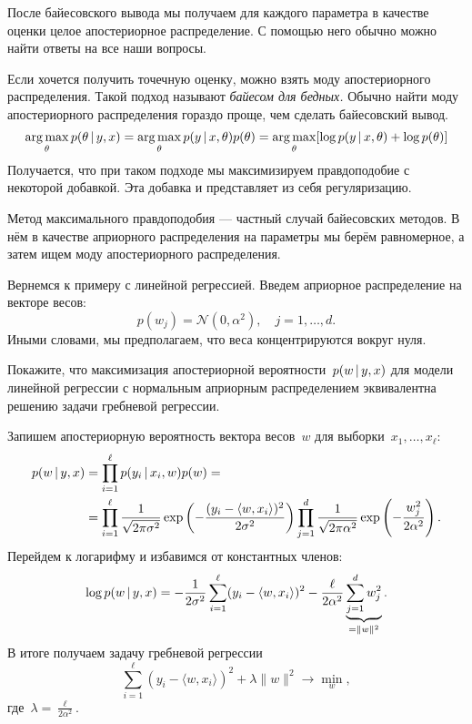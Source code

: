 \documentclass[12pt,fleqn]{article}
\begin{document}
После байесовского вывода мы получаем для каждого параметра в качестве оценки целое апостериорное распределение. С помощью него обычно можно найти ответы на все наши вопросы. 

Если хочется получить точечную оценку, можно взять моду апостериорного распределения. Такой подход называют \emph{байесом для бедных.} Обычно найти моду апостериорного распределения гораздо проще, чем сделать байесовский вывод. 
\[
\mathop{\rm arg\,max}\limits_{\theta} p(\theta \mspace{3mu}{|}\mspace{3mu} y, x) = \mathop{\rm arg\,max}\limits_{\theta} p(y \mspace{3mu}{|}\mspace{3mu} x, \theta) p(\theta) = \mathop{\rm arg\,max}\limits_{\theta}[\log p(y \mspace{3mu}{|}\mspace{3mu} x, \theta) + \log p(\theta)]
\]
Получается, что при таком подходе мы максимизируем правдоподобие с некоторой добавкой. Эта добавка и представляет из себя регуляризацию. 

Метод максимального правдоподобия --- частный случай байесовских методов. В нём в качестве априорного распределения на параметры мы берём равномерное, а затем ищем моду апостериорного распределения. 

Вернемся к примеру с линейной регрессией.
Введем априорное распределение на векторе весов:
\[
    p(w_j)
    =
    \mathcal{N}(0, \alpha^2),
    \quad j = 1, \dots, d.
\]
Иными словами, мы предполагаем, что веса концентрируются вокруг нуля.

\begin{vkProblem}
    Покажите, что максимизация апостериорной вероятности~$p(w \mspace{3mu}{|}\mspace{3mu} y, x)$
    для модели линейной регрессии с нормальным априорным распределением
    эквивалентна решению задачи гребневой регрессии.
\end{vkProblem}

\begin{esSolution}
    Запишем апостериорную вероятность вектора весов~$w$ для выборки~$x_1, \dots, x_\ell$:
    \begin{align*}
        p(w \mspace{3mu}{|}\mspace{3mu} y, x)
        &=
        \prod_{i = 1}^{\ell}
            p(y_i \mspace{3mu}{|}\mspace{3mu} x_i, w) p(w)
        =\\
        &=
        \prod_{i = 1}^{\ell}
            \frac{1}{\sqrt{2 \pi \sigma^2}}
            \exp\left(
                - \frac{(y_i - \langle w, x_i \rangle)^2}{2 \sigma^2}
            \right)
            \prod_{j = 1}^{d}
                \frac{1}{\sqrt{2 \pi \alpha^2}}
                \exp\left(
                    - \frac{w_j^2}{2 \alpha^2}
                \right).
    \end{align*}
    Перейдем к логарифму и избавимся от константных членов:
    \[
        \log p(w \mspace{3mu}{|}\mspace{3mu} y, x)
        =
        -\frac{1}{2 \sigma^2} \sum_{i = 1}^{\ell} (y_i - \langle w, x_i \rangle)^2
        -\frac{\ell}{2 \alpha^2} \underbrace{\sum_{j = 1}^{d} w_j^2}_{= \|w\|^2}.
    \]
    В итоге получаем задачу гребневой регрессии
    \[
        \sum_{i = 1}^{\ell} (y_i - \langle w, x_i \rangle)^2  + \lambda \|w\|^2 \to \min_w,
    \]
    где~$\lambda = \frac{\ell}{2 \alpha^2}$.
\end{esSolution}
\end{document}
